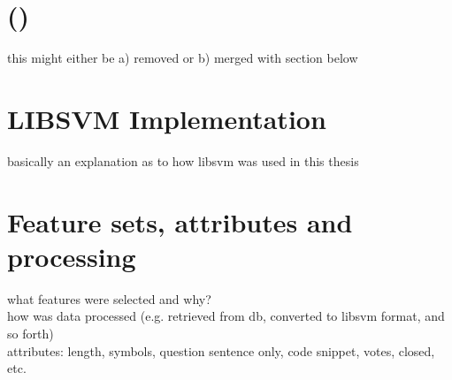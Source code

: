 \label{chap:chapter3}

\section{ ()}
\label{sec:svm}
this might either be a) removed or b) merged with section below

\section{LIBSVM Implementation}
\label{sec:libsvm_implementation}
basically an explanation as to how libsvm was used in this thesis

\section{Feature sets, attributes and processing}
\label{sec:feature_sets}
what features were selected and why? \\
how was data processed (e.g. retrieved from db, converted to libsvm format, and so forth) \\
attributes: length, symbols, question sentence only, code snippet, votes, closed, etc.

